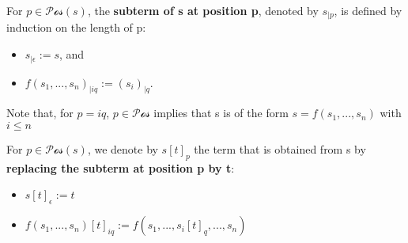   \begin{definition}
    For $p \mathop{\in} \mathcal{Pos}(s)$, the \textbf{subterm of s at position p}, denoted by $s_{|p}$, is defined by induction on the length of p:
    \begin{itemize}
      \item $s_{|\epsilon} := s$, and
      \item $f(s_1,...,s_n)_{|iq} := \left(s_i\right)_{|q}$.
    \end{itemize} 
    
    Note that, for $p \mathop{=} iq$, $p \mathop{\in} \mathcal{Pos}$ implies that s is of the form $s \mathop{=} f(s_1,...,s_n)$ with $i \le n$
    
    For $p \mathop{\in} \mathcal{Pos}(s)$, we denote by $s[t]_p$ the term that is obtained from s by \textbf{replacing the subterm at position p by t}:
  \begin{itemize}
    \item $s[t]_\epsilon := t$
    \item $f(s_1,...,s_n)[t]_{iq} := f(s_1,...,s_i[t]_{q},...,s_n)$
  \end{itemize}
  
  \end{definition}
  
  
  

